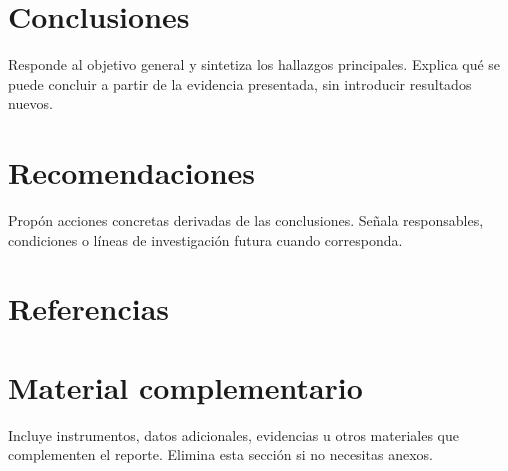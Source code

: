 \documentclass[12pt,letterpaper]{article}
\begin{document}

\section{Conclusiones}
Responde al objetivo general y sintetiza los hallazgos principales. Explica
qué se puede concluir a partir de la evidencia presentada, sin introducir
resultados nuevos.

\section{Recomendaciones}
Propón acciones concretas derivadas de las conclusiones. Señala responsables,
condiciones o líneas de investigación futura cuando corresponda.

\clearpage
{}
{}
\section*{Referencias}
\begin{doublespace}

\end{doublespace}

\clearpage
\appendix
\section{Material complementario}
Incluye instrumentos, datos adicionales, evidencias u otros materiales que
complementen el reporte. Elimina esta sección si no necesitas anexos.
\firmareporte
\end{document}
